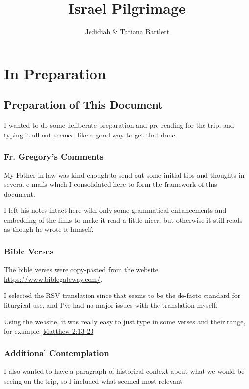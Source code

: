 \documentclass[letterpaper]{report}
\title{Israel Pilgrimage}
\author{Jedidiah \& Tatiana Bartlett}
\date{}
\begin{document}
\maketitle

\chapter{In Preparation}

\section{Preparation of This Document}
I wanted to do some deliberate preparation and pre-reading for the trip,
and typing it all out seemed like a good way to get that done.

\subsection{Fr. Gregory's Comments}
My Father-in-law was kind enough to send out some initial tips and thoughts
in several e-mails which  I consolidated here to form the framework of this 
document.

I left his notes intact here with only some grammatical enhancements and
embedding of the links to make it read a little nicer,
but otherwise it still reads as though he wrote it himself.

\subsection{Bible Verses}
The bible verses were copy-pasted from the website \url{https://www.biblegateway.com/}.

I selected the RSV translation since that seems to be the de-facto standard
for liturgical use, and I've had no major issues with the translation myself.

Using the website, it was really easy to just type in some verses and their
range, for example: \href{https://www.biblegateway.com/passage/?search=Matthew+2%3A13-23&version=RSV}{
Matthew 2:13-23}

\subsection{Additional Contemplation}
I also wanted to have a paragraph of historical context about what we would be
seeing on the trip,
so I included what seemed most relevant
\end{document}
